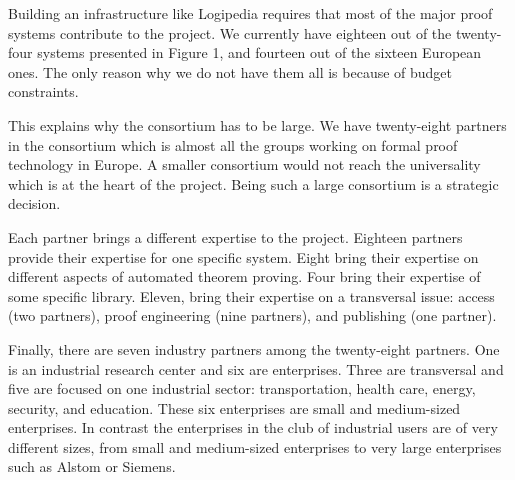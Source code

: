 Building an infrastructure like Logipedia requires that most of the
major proof systems contribute to the project. We currently have eighteen out of
the twenty-four systems presented in Figure 1, and fourteen out of the
sixteen European ones.  The only reason why we do not have them all is
because of budget constraints.

This explains why the consortium has to be large.  We have twenty-eight
partners in the consortium which is almost all the groups working on
formal proof technology in Europe.  A smaller consortium would not
reach the universality which is at the heart of the project.  Being such a
large consortium is a strategic decision.

Each partner brings a different expertise to the project.  Eighteen
partners provide their expertise for one specific system.  Eight bring
their expertise on different aspects of automated theorem
proving. Four bring their expertise of some specific library. Eleven,
bring their expertise on a transversal issue: access (two partners),
proof engineering (nine partners), and publishing (one partner).

Finally, there are seven industry partners among the twenty-eight partners.
One is an industrial research center and  six are enterprises.
Three are transversal and five are
focused on one industrial sector: transportation, health care, energy,
security, and education. These six enterprises are small and
medium-sized enterprises. In contrast the enterprises in the club of
industrial users are of very different sizes, from small and medium-sized
enterprises to very large enterprises such as Alstom or Siemens.

